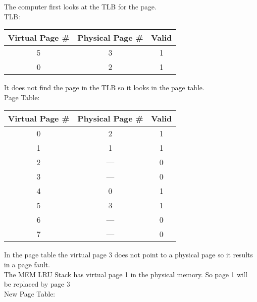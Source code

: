 \documentclass{article}
\begin{document}
 {
     The computer first looks at the TLB for the page. \\
     TLB: \\
     \begin{table}[h!]
          \centering
          \begin{tabular}{|c|c|c|}
              \hline
              \textbf{Virtual Page \#} & \textbf{Physical Page \#} & \textbf{Valid} \\ \hline
              5 & 3 & 1 \\ \hline
              0 & 2 & 1 \\ \hline
          \end{tabular}
     \end{table}
     \linebreak
     It does not find the page in the TLB so it looks in the page table. \\
     Page Table: \\
     \begin{table}[h!]
          \centering
          \begin{tabular}{|c|c|c|}
              \hline
              \textbf{Virtual Page \#} & \textbf{Physical Page \#} & \textbf{Valid} \\ \hline
              0 & 2 & 1 \\ \hline
              1 & 1 & 1 \\ \hline
              2 & --- & 0 \\ \hline
              3 & --- & 0 \\ \hline
              4 & 0 & 1 \\ \hline
              5 & 3 & 1 \\ \hline
              6 & --- & 0 \\ \hline
              7 & --- & 0 \\ \hline
          \end{tabular}
     \end{table}
     \linebreak
     In the page table the virtual page 3 does not point to a physical page so it results in a page fault. \\
     The MEM LRU Stack has virtual page 1 in the physical memory. So page 1 will be replaced by page 3 \\
     New Page Table: \\
     \begin{table}[h!]
          \centering

\end{table}}
\end{document}
